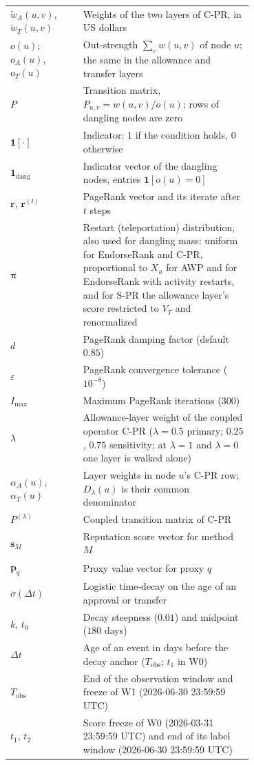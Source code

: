 \begin{longtable}{lp{0.70\linewidth}}
$\tilde w_A(u,v)$, $\tilde w_T(u,v)$ & Weights of the two layers of C-PR, in US dollars \\
$o(u)$; $o_A(u)$, $o_T(u)$ & Out-strength $\sum_v w(u,v)$ of node $u$; the same in the allowance and transfer layers \\
$P$ & Transition matrix, $P_{u,v}=w(u,v)/o(u)$; rows of dangling nodes are zero \\
$\mathbf{1}[\cdot]$ & Indicator: $1$ if the condition holds, $0$ otherwise \\
$\mathbf{1}_{\mathrm{dang}}$ & Indicator vector of the dangling nodes, entries $\mathbf{1}[o(u)=0]$ \\
$\mathbf{r}$, $\mathbf{r}^{(t)}$ & PageRank vector and its iterate after $t$ steps \\
$\boldsymbol{\pi}$ & Restart (teleportation) distribution, also used for dangling mass: uniform for EndorseRank and C-PR, proportional to $X_u$ for AWP and for EndorseRank with activity restarts, and for S-PR the allowance layer's score restricted to $V_T$ and renormalized \\
$d$ & PageRank damping factor (default $0.85$) \\
$\varepsilon$ & PageRank convergence tolerance ($10^{-8}$) \\
$I_{\max}$ & Maximum PageRank iterations ($300$) \\
$\lambda$ & Allowance-layer weight of the coupled operator C-PR ($\lambda=0.5$ primary; $0.25$, $0.75$ sensitivity; at $\lambda=1$ and $\lambda=0$ one layer is walked alone) \\
$\alpha_A(u)$, $\alpha_T(u)$ & Layer weights in node $u$'s C-PR row; $D_{\lambda}(u)$ is their common denominator \\
$P^{(\lambda)}$ & Coupled transition matrix of C-PR \\
$\mathbf{s}_M$ & Reputation score vector for method $M$ \\
$\mathbf{p}_q$ & Proxy value vector for proxy $q$ \\
$\sigma(\Delta t)$ & Logistic time-decay on the age of an approval or transfer \\
$k$, $t_0$ & Decay steepness ($0.01$) and midpoint ($180$ days) \\
$\Delta t$ & Age of an event in days before the decay anchor ($T_{\mathrm{obs}}$; $t_1$ in W0) \\
$T_{\mathrm{obs}}$ & End of the observation window and freeze of W1 (2026-06-30 23:59:59 UTC) \\
$t_1$, $t_2$ & Score freeze of W0 (2026-03-31 23:59:59 UTC) and end of its label window (2026-06-30 23:59:59 UTC) \\

\end{longtable}
